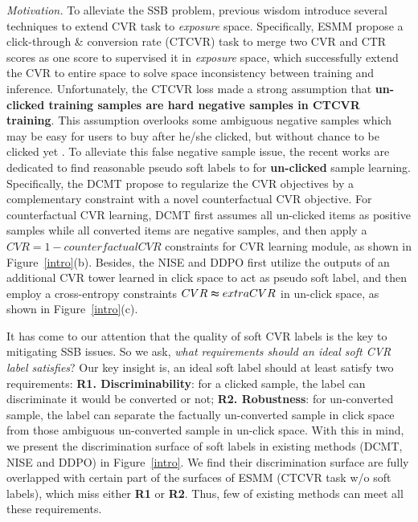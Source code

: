 \textit{Motivation.} To alleviate the SSB problem, previous wisdom introduce several techniques to extend CVR task to \textit{exposure} space.
%
Specifically, ESMM \cite{essm} propose a click-through \& conversion rate (CTCVR) task to merge two CVR and CTR scores as one score to supervised it in \textit{exposure} space, which successfully extend the CVR to entire space to solve space inconsistency between training and inference.
%
Unfortunately, the CTCVR loss made a strong assumption that \textbf{\textbf{un-clicked} training samples are hard negative samples in CTCVR training}. This assumption overlooks some ambiguous negative samples which may be easy for users to buy after he/she clicked, but without chance to be clicked yet \cite{multiipw,dcmt}.
%
To alleviate this false negative sample issue, the recent works are dedicated to find reasonable pseudo soft labels to for \textbf{un-clicked} sample learning.
%
Specifically, the DCMT \cite{dcmt} propose to regularize the CVR objectives by a complementary constraint with a novel counterfactual CVR objective. 
%
For counterfactual CVR learning, DCMT first assumes all un-clicked items as positive samples while all converted items are negative samples, and then apply a $CVR = 1 - counterfactualCVR$ constraints for CVR learning module, as shown in Figure~\ref{intro}(b). 
%
Besides, the NISE \cite{nise} and DDPO \cite{ddpo} first utilize the outputs of an additional CVR tower learned in click space to act as pseudo soft label, and then employ a cross-entropy constraints $CVR\thickapprox extraCVR$ in un-click space, as shown in Figure~\ref{intro}(c).
% 

It has come to our attention that the quality of soft CVR labels is the key to mitigating SSB issues.  So we ask, \textit{what requirements should an ideal soft CVR label satisfies}? Our key insight is, an ideal soft label should at least satisfy two requirements: \textbf{R1. Discriminability}: for a clicked sample, the label can discriminate it would be converted or not; \textbf{R2. Robustness}: for un-converted sample, the label can separate the factually un-converted sample in click space from those ambiguous un-converted sample in un-click space. With this in mind, we  present the discrimination surface of soft labels in existing methods (DCMT, NISE and DDPO) in Figure~\ref{intro}. We find their discrimination surface are fully overlapped with certain part of the surfaces of  ESMM (CTCVR task w/o soft labels), which miss either \textbf{R1} or \textbf{R2}. Thus, few of existing methods can meet all these requirements.

